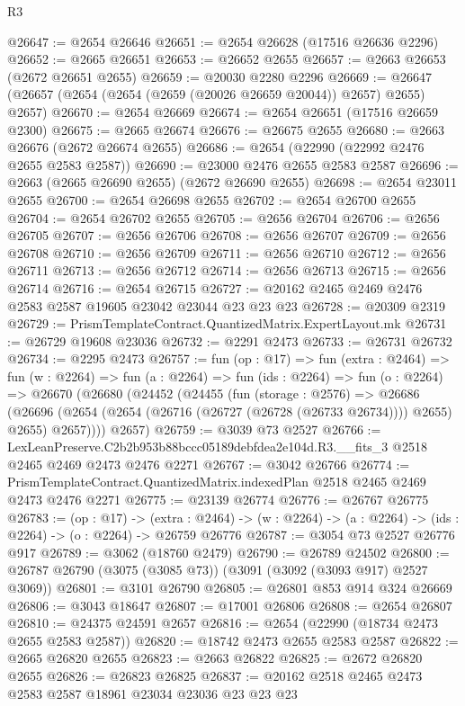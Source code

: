 \begin{lexlean}{R3}
\begin{coremodule}
@26647 := @2654 @26646
@26651 := @2654 @26628 (@17516 @26636 @2296)
@26652 := @2665 @26651
@26653 := @26652 @2655
@26657 := @2663 @26653 (@2672 @26651 @2655)
@26659 := @20030 @2280 @2296
@26669 := @26647 (@26657 (@2654 (@2654 (@2659 (@20026 @26659 @20044)) @2657) @2655) @2657)
@26670 := @2654 @26669
@26674 := @2654 @26651 (@17516 @26659 @2300)
@26675 := @2665 @26674
@26676 := @26675 @2655
@26680 := @2663 @26676 (@2672 @26674 @2655)
@26686 := @2654 (@22990 (@22992 @2476 @2655 @2583 @2587))
@26690 := @23000 @2476 @2655 @2583 @2587
@26696 := @2663 (@2665 @26690 @2655) (@2672 @26690 @2655)
@26698 := @2654 @23011 @2655
@26700 := @2654 @26698 @2655
@26702 := @2654 @26700 @2655
@26704 := @2654 @26702 @2655
@26705 := @2656 @26704
@26706 := @2656 @26705
@26707 := @2656 @26706
@26708 := @2656 @26707
@26709 := @2656 @26708
@26710 := @2656 @26709
@26711 := @2656 @26710
@26712 := @2656 @26711
@26713 := @2656 @26712
@26714 := @2656 @26713
@26715 := @2656 @26714
@26716 := @2654 @26715
@26727 := @20162 @2465 @2469 @2476 @2583 @2587 @19605 @23042 @23044 @23 @23 @23
@26728 := @20309 @2319
@26729 := PrismTemplateContract.QuantizedMatrix.ExpertLayout.mk
@26731 := @26729 @19608 @23036
@26732 := @2291 @2473
@26733 := @26731 @26732
@26734 := @2295 @2473
@26757 := fun (op : @17) =>
  fun (extra : @2464) =>
  fun (w : @2264) =>
  fun (a : @2264) =>
  fun (ids : @2264) =>
  fun (o : @2264) =>
  @26670
    (@26680
      (@24452
        (@24455
          (fun (storage : @2576) =>
          @26686
            (@26696 (@2654 (@2654 (@26716 (@26727 (@26728 (@26733 @26734)))) @2655) @2655) @2657))))
      @2657)
@26759 := @3039 @73 @2527
@26766 := LexLeanPreserve.C2b2b953b88bccc05189debfdea2e104d.R3.__fits_3
    @2518
    @2465
    @2469
    @2473
    @2476
    @2271
@26767 := @3042 @26766
@26774 := PrismTemplateContract.QuantizedMatrix.indexedPlan @2518 @2465 @2469 @2473 @2476 @2271
@26775 := @23139 @26774
@26776 := @26767 @26775
@26783 := (op : @17) ->
  (extra : @2464) -> (w : @2264) -> (a : @2264) -> (ids : @2264) -> (o : @2264) -> @26759 @26776
@26787 := @3054 @73 @2527 @26776 @917
@26789 := @3062 (@18760 @2479)
@26790 := @26789 @24502
@26800 := @26787 @26790 (@3075 (@3085 @73)) (@3091 (@3092 (@3093 @917) @2527 @3069))
@26801 := @3101 @26790
@26805 := @26801 @853 @914 @324 @26669
@26806 := @3043 @18647
@26807 := @17001 @26806
@26808 := @2654 @26807
@26810 := @24375 @24591 @2657
@26816 := @2654 (@22990 (@18734 @2473 @2655 @2583 @2587))
@26820 := @18742 @2473 @2655 @2583 @2587
@26822 := @2665 @26820 @2655
@26823 := @2663 @26822
@26825 := @2672 @26820 @2655
@26826 := @26823 @26825
@26837 := @20162 @2518 @2465 @2473 @2583 @2587 @18961 @23034 @23036 @23 @23 @23

\end{coremodule}
\end{lexlean}
